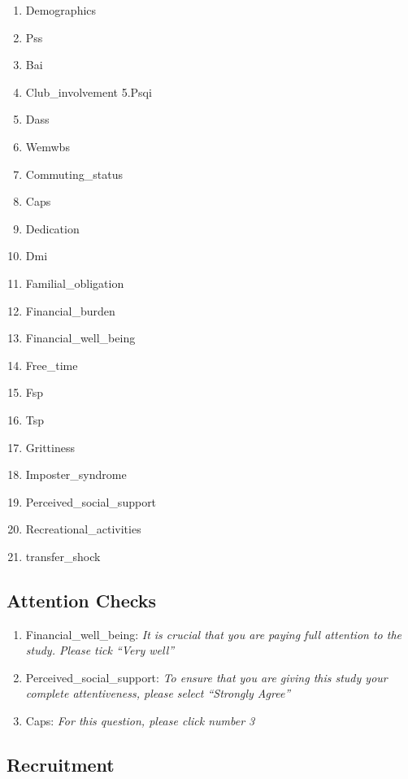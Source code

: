 \documentclass[]{book}
\providecommand{\tightlist}{%
  \setlength{\itemsep}{0pt}\setlength{\parskip}{0pt}}
\begin{document}
\begin{enumerate}
\def\labelenumi{\arabic{enumi}.}
\tightlist
\item
  Demographics
\item
  Pss
\item
  Bai
\item
  Club\_involvement
  5.Psqi
\item
  Dass
\item
  Wemwbs
\item
  Commuting\_status
\item
  Caps
\item
  Dedication
\item
  Dmi
\item
  Familial\_obligation
\item
  Financial\_burden
\item
  Financial\_well\_being
\item
  Free\_time
\item
  Fsp
\item
  Tsp
\item
  Grittiness
\item
  Imposter\_syndrome
\item
  Perceived\_social\_support
\item
  Recreational\_activities
\item
  transfer\_shock
\end{enumerate}

\hypertarget{attention-checks}{%
\subsection{Attention Checks}\label{attention-checks}}

\begin{enumerate}
\def\labelenumi{\arabic{enumi}.}
\tightlist
\item
  Financial\_well\_being:
  \emph{It is crucial that you are paying full attention to the study. Please tick ``Very well''}
\item
  Perceived\_social\_support:
  \emph{To ensure that you are giving this study your complete attentiveness, please select ``Strongly Agree''}
\item
  Caps:
  \emph{For this question, please click number 3}
\end{enumerate}

\hypertarget{recruitment}{%
\subsection{Recruitment}\label{recruitment}}
\end{document}
